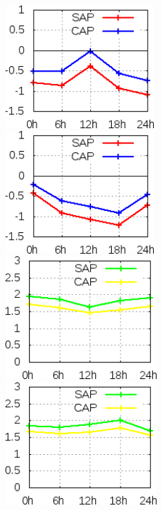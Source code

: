 \begin{figure}[!hbp]
\centering
\includegraphics[height=4.7cm]{./figs/VIES250temp0Z.png}\vspace{1.0cm}\hspace{1.0cm}\includegraphics[height=4.7cm]{./figs/VIES250temp12Z.png}
\includegraphics[height=4.7cm]{./figs/EQM250temp0Z.png}\vspace{1.0cm}\hspace{1.0cm}\includegraphics[height=4.7cm]{./figs/EQM250temp12Z.png}

\end{figure}
